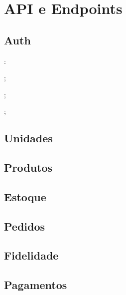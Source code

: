 
\chapter{API e Endpoints}

\section{Auth}

\begin{topics}
    \item \lipsum[1][1]:
    \begin{topics}
        \item \lipsum[1][1];
        \item \lipsum[1][1];
    \end{topics}
    \item \lipsum[1][1];
    \item \lipsum[1][1]
\end{topics}

\section{Unidades}

\section{Produtos}

\section{Estoque}

\section{Pedidos}

\section{Fidelidade}

\section{Pagamentos}

\newpage
